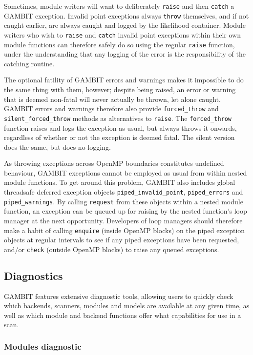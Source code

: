 \documentclass[pdftex,twocolumn,epjc3_preprint,runningheads]{svjour3}
\renewcommand{\_}{\discretionary{\underscore}{}{\underscore}}
\newcommand\cpp[1]{{\lstinline!#1!}}  %
\newcommand{\gambit}{\textsf{GAMBIT}\xspace}
\newcommand{\GB}{\gambit}
\newcommand{\omp}{\textsf{OpenMP}\xspace}
\begin{document}
Sometimes, module writers will want to deliberately \cpp{raise} and then \cpp{catch} a \GB exception.  Invalid point exceptions always \cpp{throw} themselves, and if not caught earlier, are always caught and logged by the likelihood container. Module writers who wish to \cpp{raise} and \cpp{catch} invalid point exceptions within their own module functions can therefore safely do so using the regular \cpp{raise} function, under the understanding that any logging of the error is the responsibility of the catching routine.

The optional fatility of \GB errors and warnings makes it impossible to do the same thing with them, however; despite being raised, an error or warning that is deemed non-fatal will never actually be thrown, let alone caught.  \GB errors and warnings therefore also provide \cpp{forced_throw} and \cpp{silent_forced_throw} methods as alternatives to \cpp{raise}.  The \cpp{forced_throw} function raises and logs the exception as usual, but always throws it onwards, regardless of whether or not the exception is deemed fatal.  The silent version does the same, but does no logging.

As throwing exceptions across \omp boundaries constitutes undefined behaviour, \GB exceptions cannot be employed as usual from within nested module functions.  To get around this problem, \GB also includes global threadsafe deferred exception objects \cpp{piped_invalid_point}, \cpp{piped_errors} and \cpp{piped_warnings}.  By calling \cpp{request} from these objects within a nested module function, an exception can be queued up for raising by the nested function's loop manager at the next opportunity.  Developers of loop managers should therefore make a habit of calling \cpp{enquire} (inside \omp blocks) on the piped exception objects at regular intervals to see if any piped exceptions have been requested, and/or \cpp{check} (outside \omp blocks) to raise any queued exceptions.

\subsection{Diagnostics}
\label{diagnostics}

\GB features extensive diagnostic tools, allowing users to quickly check which backends, scanners, modules and models are available at any given time, as well as which module and backend functions offer what capabilities for use in a scan.

\subsubsection{Modules diagnostic}
\label{modules diagnostic}
\end{document}
